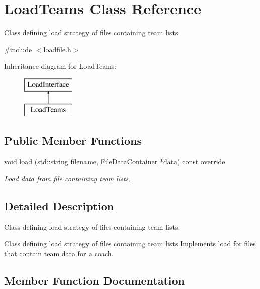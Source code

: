 \hypertarget{classLoadTeams}{}\section{Load\+Teams Class Reference}
\label{classLoadTeams}


Class defining load strategy of files containing team lists.  




{\ttfamily \#include $<$loadfile.\+h$>$}

Inheritance diagram for Load\+Teams\+:\begin{figure}[H]
\begin{center}
\leavevmode
\includegraphics[height=2.000000cm]{classLoadTeams}
\end{center}
\end{figure}
\subsection*{Public Member Functions}
\begin{DoxyCompactItemize}
\item 
void \mbox{\hyperlink{classLoadTeams_afbd12f0d1b9630e0e4260979a4a78d6c}{load}} (std\+::string filename, \mbox{\hyperlink{classFileDataContainer}{File\+Data\+Container}} $\ast$data) const override
\begin{DoxyCompactList}\small\item\em Load data from file containing team lists. \end{DoxyCompactList}\end{DoxyCompactItemize}


\subsection{Detailed Description}
Class defining load strategy of files containing team lists. 

Class defining load strategy of files containing team lists Implements load for files that contain team data for a coach. 

\subsection{Member Function Documentation}
\mbox{\label{classLoadTeams_afbd12f0d1b9630e0e4260979a4a78d6c}} 
